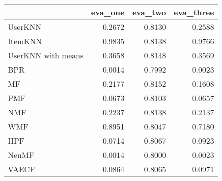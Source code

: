 \begin{tabular}{lrrr}
\toprule
{} &  eva\_one &  eva\_two &  eva\_three \\
\midrule
UserKNN            &   0.2672 &   0.8130 &     0.2588 \\
ItemKNN            &   0.9835 &   0.8138 &     0.9766 \\
UserKNN with means &   0.3658 &   0.8148 &     0.3569 \\
BPR                &   0.0014 &   0.7992 &     0.0023 \\
MF                 &   0.2177 &   0.8152 &     0.1608 \\
PMF                &   0.0673 &   0.8103 &     0.0657 \\
NMF                &   0.2237 &   0.8138 &     0.2137 \\
WMF                &   0.8951 &   0.8047 &     0.7180 \\
HPF                &   0.0714 &   0.8067 &     0.0923 \\
NeuMF              &   0.0014 &   0.8000 &     0.0023 \\
VAECF              &   0.0864 &   0.8065 &     0.0971 \\
\bottomrule
\end{tabular}
